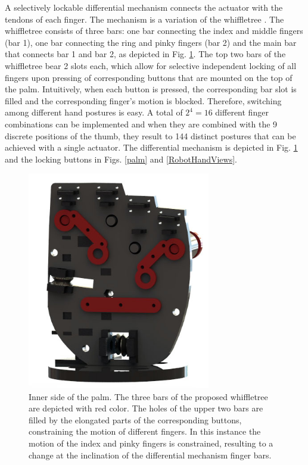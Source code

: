 A selectively lockable differential mechanism connects the actuator with the tendons of each finger. The mechanism is a variation of the whiffletree \cite{Birglen}. The whiffletree consists of three bars: one bar connecting the index and middle fingers (bar 1), one bar connecting the ring and pinky fingers (bar 2) and the main bar that connects bar 1 and bar 2, as depicted in Fig. \ref{differential}. The top two bars of the whiffletree bear 2 slots each, which allow for selective independent locking of all fingers upon pressing of corresponding buttons that are mounted on the top of the palm. Intuitively, when each button is pressed, the corresponding bar slot is filled and the corresponding finger's motion is blocked. Therefore, switching among different hand postures is easy. A total of $2^4=16$ different finger combinations can be implemented and when they are combined with the 9 discrete positions of the thumb, they result to 144 distinct postures that can be achieved with a single actuator. The differential mechanism is depicted in Fig. \ref{differential} and the locking buttons in Figs. \ref{palm} and \ref{RobotHandViews}.

\begin{figure}[h]
\begin{center}
\includegraphics[width=8cm]{figures/paper_images/whiffletree.jpg}
\end{center}
\caption{Inner side of the palm. The three bars of the proposed whiffletree are depicted with red color. The holes of the upper two bars are filled by the elongated parts of the corresponding buttons, constraining the motion of different fingers. In this instance the motion of the index and pinky fingers is constrained, resulting to a change at the inclination of the differential mechanism finger bars.} 
\label{differential}
\end{figure}

